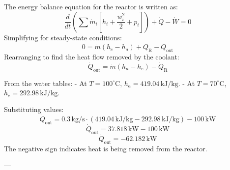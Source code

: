 The energy balance equation for the reactor is written as:  
\[
\frac{d}{dt} \left( \sum \dot{m}_i \left[ h_i + \frac{w_i^2}{2} + p_i \right] \right) + \dot{Q} - \dot{W} = 0
\]  
Simplifying for steady-state conditions:  
\[
0 = \dot{m} (h_e - h_a) + \dot{Q}_\text{R} - \dot{Q}_\text{out}
\]  
Rearranging to find the heat flow removed by the coolant:  
\[
\dot{Q}_\text{out} = \dot{m} (h_a - h_e) - \dot{Q}_\text{R}
\]  

From the water tables:  
- At \( T = 100^\circ\text{C} \), \( h_a = 419.04 \, \text{kJ/kg} \).  
- At \( T = 70^\circ\text{C} \), \( h_e = 292.98 \, \text{kJ/kg} \).  

Substituting values:  
\[
\dot{Q}_\text{out} = 0.3 \, \text{kg/s} \cdot (419.04 \, \text{kJ/kg} - 292.98 \, \text{kJ/kg}) - 100 \, \text{kW}
\]  
\[
\dot{Q}_\text{out} = 37.818 \, \text{kW} - 100 \, \text{kW}
\]  
\[
\dot{Q}_\text{out} = -62.182 \, \text{kW}
\]  
The negative sign indicates heat is being removed from the reactor.  

---